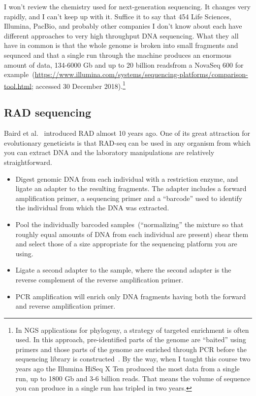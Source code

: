 I won't review the chemistry used for next-generation sequencing. It
changes very rapidly, and I can't keep up with it. Suffice it to say
that 454 Life Sciences, Illumina, PacBio, and probably other companies
I don't know about each have different approaches to very high
throughput DNA sequencing. What they all have in common is that the
whole genome is broken into small fragments and sequnced and that a
single run through the machine produces an enormous amount of data,
134-6000 Gb and up to 20 billion readsfrom a NovaSeq 600 for
example~(\url{https://www.illumina.com/systems/sequencing-platforms/comparison-tool.html};
accessed 30 December 2018).\footnote{In NGS applications for
  phylogeny, a strategy of targeted enrichment is often used. In this
  approach, pre-identified parts of the genome are ``baited'' using
  primers and those parts of the genome are enriched through PCR
  before the sequencing library is
  constructed~\cite{Lemmon-etal-2012}. By the way, when I taught this
  course two years ago the Illumina HiSeq X Ten produced the most data
  from a single run, up to 1800 Gb and 3-6 billion reads. That means
  the volume of sequence you can produce in a single run has tripled
  in two years.}

\subsection*{RAD sequencing}

Baird et al.~\cite{Baird-etal-2008} introduced RAD almost 10 years
ago. One of its great attraction for evolutionary geneticists is that
RAD-seq can be used in any organism from which you can extract DNA and
the laboratory manipulations are relatively straightforward.

\begin{itemize}

\item Digest genomic DNA from each individual with a restriction
  enzyme, and ligate an adapter to the resulting fragments. The
  adapter includes a forward amplification primer, a sequencing primer
  and a ``barcode'' used to identify the individual from which the DNA
  was extracted.

\item Pool the individually barcoded samples~(``normalizing'' the
  mixture so that roughly equal amounts of DNA from each individual
  are present) shear them and select those of a size appropriate for
  the sequencing platform you are using.

\item Ligate a second adapter to the sample, where the second adapter
  is the reverse complement of the reverse amplification primer. 

\item PCR amplification will enrich only DNA fragments having both the
  forward and reverse amplification primer.

\end{itemize}

